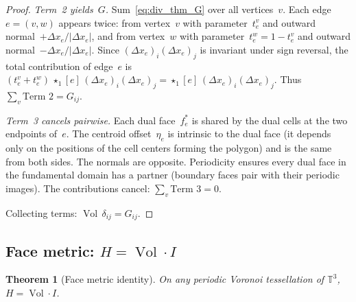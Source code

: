 \documentclass[preprint,12pt]{elsarticle}
\newtheorem{theorem}{Theorem}[section]
\DeclareMathOperator{\Vol}{Vol}
\begin{document}
\begin{proof}
\emph{Term~2 yields~$G$.}
Sum~\eqref{eq:div_thm_G} over all vertices~$v$. Each edge $e = (v,w)$
appears twice: from vertex~$v$ with parameter~$t_e^v$ and outward
normal~$+\Delta x_e/|\Delta x_e|$, and from vertex~$w$ with
parameter~$t_e^w = 1 - t_e^v$ and outward normal~$-\Delta x_e/|\Delta x_e|$.
Since $(\Delta x_e)_i(\Delta x_e)_j$ is invariant under sign reversal, the
total contribution of edge~$e$ is
$(t_e^v + t_e^w)\, \star_1[e]\, (\Delta x_e)_i (\Delta x_e)_j
= \star_1[e]\, (\Delta x_e)_i (\Delta x_e)_j$.
Thus $\sum_v \text{Term~2} = G_{ij}$.

\emph{Term~3 cancels pairwise.}
Each dual face~$f^*_e$ is shared by the dual cells at the two endpoints
of~$e$. The centroid offset~$\eta_e$ is intrinsic to the dual face (it
depends only on the positions of the cell centers forming the polygon) and
is the same from both sides. The normals are opposite.
Periodicity ensures every dual face in the fundamental domain has a partner
(boundary faces pair with their periodic images). The contributions cancel:
$\sum_v \text{Term~3} = 0$.

Collecting terms: $\Vol\, \delta_{ij} = G_{ij}$.
\end{proof}

\subsection{Face metric: $H = \Vol \cdot I$}
\label{sec:H_proof}

\begin{theorem}[Face metric identity]
\label{thm:H}
On any periodic Voronoi tessellation of\/ $\mathbb{T}^3$,
$H = \Vol \cdot I$.
\end{theorem}
\end{document}
